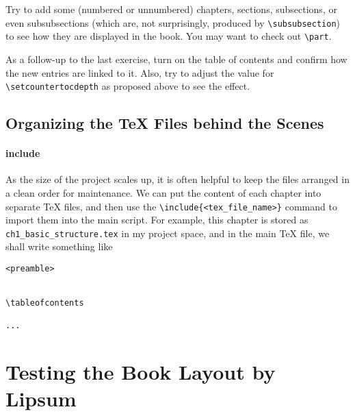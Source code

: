 \begin{exercisebox}
\begin{Exercise}
Try to add some (numbered or unnumbered) chapters, sections, subsections, or even subsubsections (which are, not surprisingly, produced by \texttt{\textbackslash subsubsection}) to see how they are displayed in the book. You may want to check out \texttt{\textbackslash part}.
\end{Exercise}
\begin{Exercise}
As a follow-up to the last exercise, turn on the table of contents and confirm how the new entries are linked to it. Also, try to adjust the value for \texttt{\textbackslash setcounter{tocdepth}} as proposed above to see the effect.
\end{Exercise}
\end{exercisebox}

\subsection{Organizing the \TeX{} Files behind the Scenes}
\label{subsection:TeXorg}

\paragraph{include}
As the size of the project scales up, it is often helpful to keep the files arranged in a clean order for maintenance. We can put the content of each chapter into separate \TeX{} files, and then use the \texttt{\textbackslash include\{<tex\_file\_name>\}} command to import them into the main script. For example, this chapter is stored as \texttt{ch1\_basic\_structure.tex} in my project space, and in the main \TeX{} file, we shall write something like
\begin{lstlisting}
<preamble>


\tableofcontents

...

\end{lstlisting}

\section{Testing the Book Layout by Lipsum}

